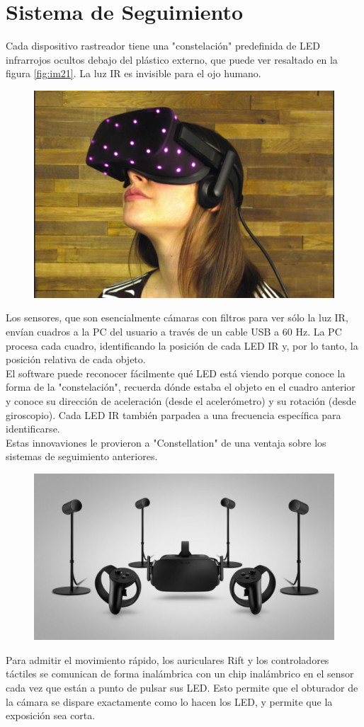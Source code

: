 \section{Sistema de Seguimiento}
Cada dispositivo rastreador tiene una "constelación" predefinida de LED infrarrojos ocultos debajo del plástico externo, que puede ver resaltado en la figura \ref{fig:im21}. 
La luz IR es invisible para el ojo humano.\\
\begin{figure}[H]
	\begin{center}
 		\includegraphics[width = .5\textwidth]{source/images/image55.png}
	\end{center} 
\end{figure}
Los sensores, que son esencialmente cámaras con filtros para ver sólo la luz IR, envían cuadros a la PC del usuario a través de un cable USB a 60 Hz. La PC procesa 
cada cuadro, identificando la posición de cada LED IR y, por lo tanto, la posición relativa de cada objeto.\\
El software puede reconocer fácilmente qué LED está viendo porque conoce la forma de la "constelación", recuerda dónde estaba el objeto en el cuadro anterior y conoce 
su dirección de aceleración (desde el acelerómetro) y su rotación (desde giroscopio). Cada LED IR también parpadea a una frecuencia específica para identificarse.\\
Estas innovaviones le provieron a "Constellation" de una ventaja sobre los sistemas de seguimiento anteriores.\\
\begin{figure}[H]
	\begin{center}
 		\includegraphics[width = .5\textwidth]{source/images/image15.png}
	\end{center} 
\end{figure}
Para admitir el movimiento rápido, los auriculares Rift y los controladores táctiles se comunican de forma inalámbrica con un chip inalámbrico en el sensor cada vez 
que están a punto de pulsar sus LED. Esto permite que el obturador de la cámara se dispare exactamente como lo hacen los LED, y permite que la exposición sea corta.\\

